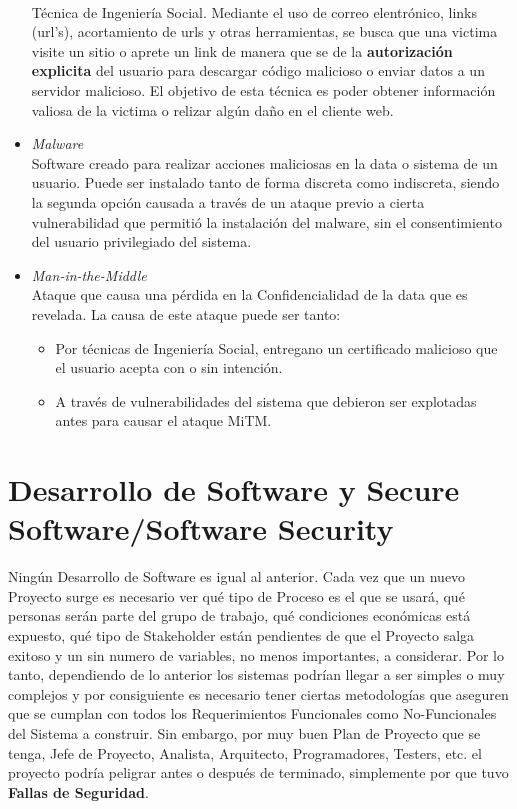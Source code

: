 \begin{itemize}
		\\Técnica de Ingeniería Social. Mediante el uso de correo elentrónico, links (url's), acortamiento de urls y otras herramientas, se busca que una victima visite un sitio o aprete un link de manera que se de la \textbf{autorización explicita} del usuario para descargar código malicioso o enviar datos a un servidor malicioso. El objetivo de esta técnica es poder obtener información valiosa de la victima o relizar algún daño en el cliente web.
	\item \textit{Malware}
		\\Software creado para realizar acciones maliciosas en la data o sistema de un usuario. Puede ser instalado tanto de forma discreta como indiscreta, siendo la segunda opción causada a través de un ataque previo a cierta vulnerabilidad que permitió la instalación del malware, sin el consentimiento del usuario privilegiado del sistema.
	\item \textit{Man-in-the-Middle}
		\\Ataque que causa una pérdida en la Confidencialidad de la data que es revelada. La causa de este ataque puede ser tanto:
			\begin{itemize}
				\item Por técnicas de Ingeniería Social, entregano un certificado malicioso que el usuario acepta con o sin intención.
				\item A través de vulnerabilidades del sistema que debieron ser explotadas antes para causar el ataque MiTM.
			\end{itemize}
\end{itemize}



\section{Desarrollo de Software y Secure Software/Software Security}
\label{chap:SD_SS}

Ningún Desarrollo de Software es igual al anterior. Cada vez que un nuevo Proyecto surge es necesario ver qué tipo de Proceso es el que se usará, qué personas serán parte del grupo de trabajo, qué condiciones económicas está expuesto, qué tipo de Stakeholder están pendientes de que el Proyecto salga exitoso y un sin numero de variables, no menos importantes, a considerar. Por lo tanto, dependiendo de lo anterior los sistemas podrían llegar a ser simples o muy complejos y por consiguiente es necesario tener ciertas metodologías que aseguren que se cumplan con todos los Requerimientos Funcionales como No-Funcionales del Sistema a construir. Sin embargo, por muy buen Plan de Proyecto que se tenga, Jefe de Proyecto, Analista, Arquitecto, Programadores, Testers, etc. el proyecto podría peligrar antes o después de terminado, simplemente por que tuvo \textbf{Fallas de Seguridad}.

